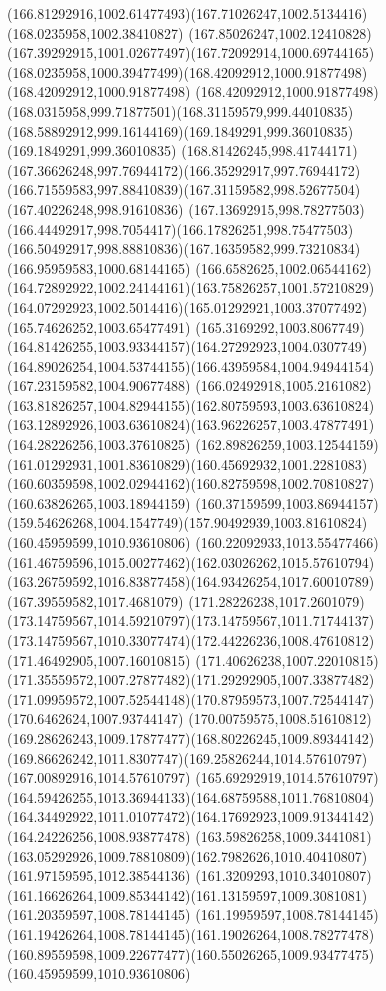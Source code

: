 {{	\curveto(166.81292916,1002.61477493)(167.71026247,1002.5134416)(168.0235958,1002.38410827)
	\curveto(167.85026247,1002.12410828)(167.39292915,1001.02677497)(167.72092914,1000.69744165)
	\curveto(168.0235958,1000.39477499)(168.42092912,1000.91877498)(168.42092912,1000.91877498)
	\curveto(168.42092912,1000.91877498)(168.0315958,999.71877501)(168.31159579,999.44010835)
	\curveto(168.58892912,999.16144169)(169.1849291,999.36010835)(169.1849291,999.36010835)
	\curveto(168.81426245,998.41744171)(167.36626248,997.76944172)(166.35292917,997.76944172)
	\curveto(166.71559583,997.88410839)(167.31159582,998.52677504)(167.40226248,998.91610836)
	\curveto(167.13692915,998.78277503)(166.44492917,998.7054417)(166.17826251,998.75477503)
	\curveto(166.50492917,998.88810836)(167.16359582,999.73210834)(166.95959583,1000.68144165)
	\curveto(166.6582625,1002.06544162)(164.72892922,1002.24144161)(163.75826257,1001.57210829)
	\curveto(164.07292923,1002.5014416)(165.01292921,1003.37077492)(165.74626252,1003.65477491)
	\curveto(165.3169292,1003.8067749)(164.81426255,1003.93344157)(164.27292923,1004.0307749)
	\curveto(164.89026254,1004.53744155)(166.43959584,1004.94944154)(167.23159582,1004.90677488)
	\curveto(166.02492918,1005.2161082)(163.81826257,1004.82944155)(162.80759593,1003.63610824)
	\curveto(163.12892926,1003.63610824)(163.96226257,1003.47877491)(164.28226256,1003.37610825)
	\curveto(162.89826259,1003.12544159)(161.01292931,1001.83610829)(160.45692932,1001.2281083)
	\curveto(160.60359598,1002.02944162)(160.82759598,1002.70810827)(160.63826265,1003.18944159)
	\curveto(160.37159599,1003.86944157)(159.54626268,1004.1547749)(157.90492939,1003.81610824)
	\moveto(160.45959599,1010.93610806)
	\curveto(160.22092933,1013.55477466)(161.46759596,1015.00277462)(162.03026262,1015.57610794)
	\curveto(163.26759592,1016.83877458)(164.93426254,1017.60010789)(167.39559582,1017.4681079)
	\curveto(171.28226238,1017.2601079)(173.14759567,1014.59210797)(173.14759567,1011.71744137)
	\curveto(173.14759567,1010.33077474)(172.44226236,1008.47610812)(171.46492905,1007.16010815)
	\curveto(171.40626238,1007.22010815)(171.35559572,1007.27877482)(171.29292905,1007.33877482)
	\curveto(171.09959572,1007.52544148)(170.87959573,1007.72544147)(170.6462624,1007.93744147)
	\curveto(170.00759575,1008.51610812)(169.28626243,1009.17877477)(168.80226245,1009.89344142)
	\curveto(169.86626242,1011.8307747)(169.25826244,1014.57610797)(167.00892916,1014.57610797)
	\curveto(165.69292919,1014.57610797)(164.59426255,1013.36944133)(164.68759588,1011.76810804)
	\curveto(164.34492922,1011.01077472)(164.17692923,1009.91344142)(164.24226256,1008.93877478)
	\curveto(163.59826258,1009.3441081)(163.05292926,1009.78810809)(162.7982626,1010.40410807)
	\lineto(161.97159595,1012.38544136)
	\lineto(161.3209293,1010.34010807)
	\curveto(161.16626264,1009.85344142)(161.13159597,1009.3081081)(161.20359597,1008.78144145)
	\curveto(161.19959597,1008.78144145)(161.19426264,1008.78144145)(161.19026264,1008.78277478)
	\curveto(160.89559598,1009.22677477)(160.55026265,1009.93477475)(160.45959599,1010.93610806)
}
}
